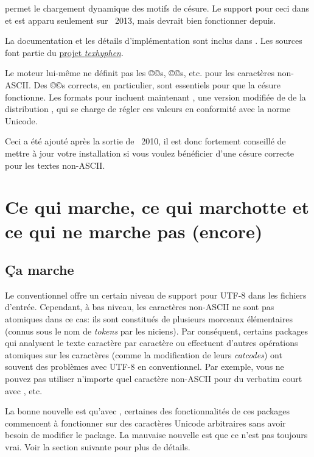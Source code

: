 \documentclass{lltxdoc}
\begin{document}
\luatex permet le chargement dynamique des motifs de césure. Le support pour ceci
dans  et  est apparu seulement sur \texlive{}~2013,
mais devrait bien fonctionner depuis.

La documentation et les détails d'implémentation sont inclus dans .
Les sources font partie du \href{http://tug.org/tex-hyphen/}{projet \emph{texhyphen}}.


Le moteur lui-même ne définit pas les ©\catcode©s, ©\lccode©s, etc. pour les
caractères non-ASCII. Des ©\lccode©s corrects, en particulier, sont essentiels
pour que la césure fonctionne. Les formats pour \luatex incluent maintenant
, une version modifiée de 
de la distribution \xetex, qui se charge de régler ces valeurs en conformité avec
la norme Unicode.

Ceci a été ajouté après la sortie de \texlive{}~2010, il est donc fortement conseillé
de mettre à jour votre installation si vous voulez bénéficier d'une césure correcte
pour les textes non-ASCII.


\section{Ce qui marche, ce qui marchotte et ce qui ne marche pas (encore)}\label{workornot}

\subsection{Ça marche}\label{working}

Le \latex conventionnel offre un certain niveau de support pour UTF-8 dans
les fichiers d'entrée. Cependant, à bas niveau, les caractères non-ASCII
ne sont pas atomiques dans ce cas: ils sont constitués de plusieurs morceaux
élémentaires (connus sous le nom de \emph{tokens} par les \tex{}niciens).
Par conséquent, certains packages qui analysent le texte caractère par caractère
ou effectuent d'autres opérations atomiques sur les caractères (comme la
modification de leurs \emph{catcodes}) ont souvent des problèmes avec UTF-8
en \latex conventionnel. Par exemple, vous ne pouvez pas utiliser n'importe
quel caractère non-ASCII pour du verbatim court avec , etc.

La bonne nouvelle est qu'avec \lualatex, certaines des fonctionnalités de ces packages
commencent à fonctionner sur des caractères Unicode arbitraires sans avoir besoin de
modifier le package. La mauvaise nouvelle est que ce n'est pas toujours vrai.
Voir la section suivante pour plus de détails.
\end{document}
